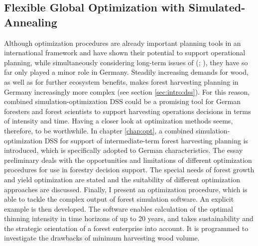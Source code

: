 \subsection{Flexible Global Optimization with Simulated-Annealing}
\label{subsec:intro:struct:opt}
Although optimization procedures are already important planning tools in an international framework \citep[p. 1]{hoganson_2015} and have shown their potential to support operational planning, while simultaneously considering long-term issues of (\citealp[p. 1]{hoganson_2015}; \citealp[p. 1081]{pretzsch_2008}), they have so far only played a minor role in Germany. Steadily increasing demands for wood, as well as for further ecosystem benefits, makes forest harvesting planning in Germany increasingly more complex (see section \ref{sec:intro:dss}). For this reason, combined simulation-optimization DSS could be a promising tool for German foresters and forest scientists to support harvesting operations decisions in terms of intensity and time. Having a closer look at optimization methods seems, therefore, to be worthwhile. In chapter \ref{chap:opt}, a combined simulation-optimization DSS for support of intermediate-term forest harvesting planning is introduced, which is specifically adopted to German characteristics. The essay preliminary deals with the opportunities and limitations of different optimization procedures for use in forestry decision support. The special needs of forest growth and yield optimization are stated and the suitability of different optimization approaches are discussed. Finally, I present an optimization procedure, which is able to tackle the complex output of forest simulation software. An explicit example is then developed. The software enables calculation of the optimal thinning intensity in time horizons of up to 20 years, and takes sustainability and the strategic orientation of a forest enterprise into account. It is programmed to investigate the drawbacks of minimum harvesting wood volume.

